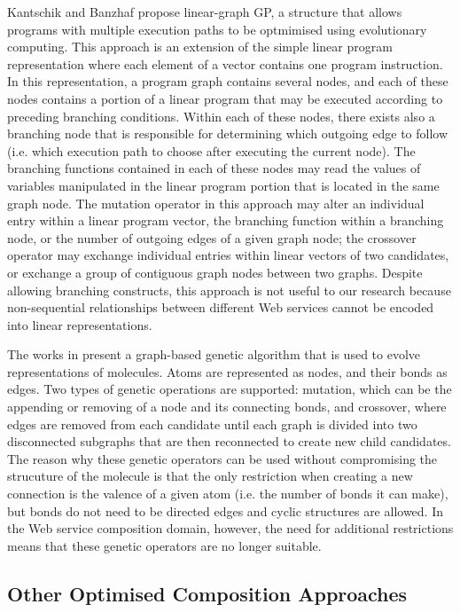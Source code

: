Kantschik and Banzhaf \cite{kantschik2002linear} propose linear-graph GP, a structure that allows programs with multiple execution paths to be optmimised using evolutionary computing. This approach is an extension of the simple linear program representation where each element of a vector contains one program instruction. In this representation, a program graph contains several nodes, and each of these nodes contains a portion of a linear program that may be executed according to preceding branching conditions. Within each of these nodes, there exists also a branching node that is responsible for determining which outgoing edge to follow (i.e. which execution path to choose after executing the current node). The branching functions contained in each of these nodes may read the values of variables manipulated in the linear program portion that is located in the same graph node. The mutation operator in this approach may alter an individual entry within a linear program vector, the branching function within a branching node, or the number of outgoing edges of a given graph node; the crossover operator may exchange individual entries within linear vectors of two candidates, or exchange a group of contiguous graph nodes between two graphs. Despite allowing branching constructs, this approach is not useful to our research because non-sequential relationships between different Web services cannot be encoded into linear representations.

The works in \cite{globus1999automatic,brown2004graph,nicolaou2009novo} present a graph-based genetic algorithm that is used to evolve representations of molecules. Atoms are represented as nodes, and their bonds as edges. Two types of genetic operations are supported: mutation, which can be the appending or removing of a node and its connecting bonds,
and crossover, where edges are removed from each candidate until each graph is divided into two disconnected subgraphs that are then reconnected to create new child candidates. The reason why these genetic operators can be used without compromising the strucuture of the molecule is that the only restriction when creating a new connection is the valence of a given atom (i.e. the number of bonds it can make), but bonds do not need to be directed edges and cyclic structures are allowed. In the Web service composition domain, however, the need for additional restrictions means that these genetic operators are no longer suitable.

\subsection{Other Optimised Composition Approaches}

